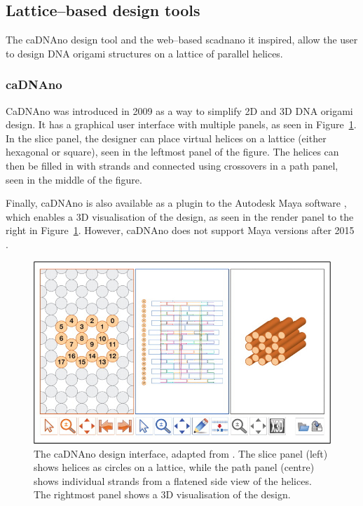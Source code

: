 \subsection{Lattice--based design tools}
The caDNAno design tool \cite{cadnano} and the web--based scadnano \cite{scadnano} it inspired, allow the user to design DNA origami structures on a lattice of parallel helices.

\subsubsection{caDNAno}
\label{sec:cadnano}
CaDNAno \cite{cadnano} was introduced in 2009 as a way to simplify 2D and 3D DNA origami design. It has a graphical user interface with multiple panels, as seen in Figure~\ref{fig:cadnano}. In the slice panel, the designer can place virtual helices on a lattice (either hexagonal or square), seen in the leftmost panel of the figure. The helices can then be filled in with strands and connected using crossovers in a path panel, seen in the middle of the figure.

Finally, caDNAno is also available as a plugin to the Autodesk Maya software \cite{maya}, which enables a 3D visualisation of the design, as seen in the render panel to the right in Figure~\ref{fig:cadnano}. However, caDNAno does not support Maya versions after 2015 \cite{cadnanoInstall}.

\begin{figure}[ht]
  \begin{center}
    \includegraphics[width=\textwidth]{figures/cadnano.jpeg}
    \caption{The caDNAno design interface, adapted from \cite{cadnano}. The slice panel (left) shows helices as circles on a lattice, while the path panel (centre) shows individual strands from a flatened side view of the helices. The rightmost panel shows a 3D visualisation of the design.}
    \label{fig:cadnano}
  \end{center}
\end{figure}

